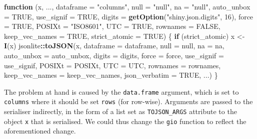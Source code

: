 \documentclass[10pt,]{krantz}
\makeatletter
\newenvironment{Shaded}{\begin{snugshade}}{\end{snugshade}}
\newcommand{\ControlFlowTok}[1]{\textcolor[rgb]{0.27,0.27,0.27}{\textbf{#1}}}
\newcommand{\DataTypeTok}[1]{\textcolor[rgb]{0.27,0.27,0.27}{#1}}
\newcommand{\DecValTok}[1]{\textcolor[rgb]{0.06,0.06,0.06}{#1}}
\newcommand{\KeywordTok}[1]{\textcolor[rgb]{0.27,0.27,0.27}{\textbf{#1}}}
\newcommand{\NormalTok}[1]{#1}
\newcommand{\OperatorTok}[1]{\textcolor[rgb]{0.43,0.43,0.43}{\textbf{#1}}}
\newcommand{\OtherTok}[1]{\textcolor[rgb]{0.37,0.37,0.37}{#1}}
\newcommand{\StringTok}[1]{\textcolor[rgb]{0.5,0.5,0.5}{#1}}
\newenvironment{kframe}{%
\medskip{}
\setlength{\fboxsep}{.8em}
 \def\at@end@of@kframe{}%
 \ifinner\ifhmode%
  \def\at@end@of@kframe{\end{minipage}}%
  \begin{minipage}{\columnwidth}%
 \fi\fi%
 \def\FrameCommand##1{\hskip\@totalleftmargin \hskip-\fboxsep
 \colorbox{shadecolor}{##1}\hskip-\fboxsep
     \hskip-\linewidth \hskip-\@totalleftmargin \hskip\columnwidth}%
 \MakeFramed {\advance\hsize-\width
   \@totalleftmargin\z@ \linewidth\hsize
   \@setminipage}}%
 {\par\unskip\endMakeFramed%
 \at@end@of@kframe}
\renewenvironment{Shaded}{\begin{kframe}}{\end{kframe}}
\makeatother
\begin{document}
\begin{Shaded}
\begin{Highlighting}[]
\ControlFlowTok{function}\NormalTok{ (x, ..., }\DataTypeTok{dataframe =} \StringTok{"columns"}\NormalTok{, }\DataTypeTok{null =} \StringTok{"null"}\NormalTok{, }
\DataTypeTok{na =} \StringTok{"null"}\NormalTok{, }\DataTypeTok{auto_unbox =} \OtherTok{TRUE}\NormalTok{, }\DataTypeTok{use_signif =} \OtherTok{TRUE}\NormalTok{, }
  \DataTypeTok{digits =} \KeywordTok{getOption}\NormalTok{(}\StringTok{"shiny.json.digits"}\NormalTok{, }\DecValTok{16}\NormalTok{), }\DataTypeTok{force =} \OtherTok{TRUE}\NormalTok{,}
  \DataTypeTok{POSIXt =} \StringTok{"ISO8601"}\NormalTok{, }\DataTypeTok{UTC =} \OtherTok{TRUE}\NormalTok{, }\DataTypeTok{rownames =} \OtherTok{FALSE}\NormalTok{, }
  \DataTypeTok{keep_vec_names =} \OtherTok{TRUE}\NormalTok{, }\DataTypeTok{strict_atomic =} \OtherTok{TRUE}\NormalTok{) }
\NormalTok{\{}
  \ControlFlowTok{if}\NormalTok{ (strict_atomic) }
\NormalTok{      x <-}\StringTok{ }\KeywordTok{I}\NormalTok{(x)}
\NormalTok{  jsonlite}\OperatorTok{::}\KeywordTok{toJSON}\NormalTok{(x, }\DataTypeTok{dataframe =}\NormalTok{ dataframe, }\DataTypeTok{null =}\NormalTok{ null, }\DataTypeTok{na =}\NormalTok{ na, }
    \DataTypeTok{auto_unbox =}\NormalTok{ auto_unbox, }\DataTypeTok{digits =}\NormalTok{ digits, }\DataTypeTok{force =}\NormalTok{ force, }
    \DataTypeTok{use_signif =}\NormalTok{ use_signif, }\DataTypeTok{POSIXt =}\NormalTok{ POSIXt, }\DataTypeTok{UTC =}\NormalTok{ UTC, }
    \DataTypeTok{rownames =}\NormalTok{ rownames, }\DataTypeTok{keep_vec_names =}\NormalTok{ keep_vec_names, }
    \DataTypeTok{json_verbatim =} \OtherTok{TRUE}\NormalTok{, ...)}
\NormalTok{\}}
\end{Highlighting}
\end{Shaded}

The problem at hand is caused by the \texttt{data.frame} argument, which is set to \texttt{columns} where it should be set \texttt{rows} (for row-wise). Arguments are passed to the serialiser indirectly, in the form of a list set as \texttt{TOJSON\_ARGS} attribute to the object \texttt{x} that is serialised. We could thus change the \texttt{gio} function to reflect the aforementioned change.
\end{document}
